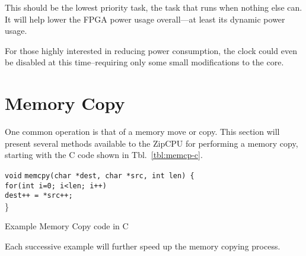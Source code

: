 \documentclass{gqtekspec}
\begin{document}
This should be the lowest priority task, the task that runs when nothing else
can.  It will help lower the FPGA power usage overall---at least its dynamic
power usage.

For those highly interested in reducing power consumption, the clock could
even be disabled at this time--requiring only some small modifications to the
core.

\section{Memory Copy}
One common operation is that of a memory move or copy.  This section will
present several methods available to the ZipCPU for performing a memory
copy, starting with the C code shown in Tbl.~\ref{tbl:memcp-c}.
\begin{table}\begin{center}
\parbox{4in}{\begin{tabbing}
{\tt void} \= {\tt memcpy(char *dest, char *src, int len) \{} \\
	\> {\tt for(int i=0; i<len; i++)} \\
	\> \hspace{0.2in} {\tt *dest++ = *src++;} \\
\}
\end{tabbing}}
\caption{Example Memory Copy code in C}\label{tbl:memcp-c}
\end{center}\end{table}
Each successive example will further speed up the memory copying process.
\end{document}
